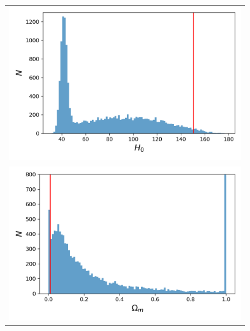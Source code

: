 \documentclass[aps,prl,10pt,twocolumn,superscriptaddress, nofootinbib]{revtex4}
\begin{document}
\begin{figure}[htb]
   \centering
   \begin{tabular}{c}
\includegraphics[width=100mm]{pressureless_matter/CC_h0_sim.png}  \\ \includegraphics[width=100mm]{pressureless_matter/CC_om_sim.png}
    \end{tabular}
\caption{}
\label{fig:CCsims} 
\end{figure}
\end{document}
